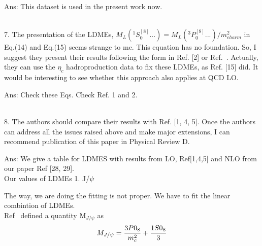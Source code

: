 \documentclass[aps,prc,preprint]{revtex4}
\begin{document}
Ans: This dataset is used in the present work now.

\ \\


7. The presentation of the LDMEs, $M_L(^1S^{[8]}_0 ...) = M_L(^3P^{[8]}_0 ...)/m^2_{charm}$
in Eq.(14) and Eq.(15) seems strange to me. This equation has no foundation. 
So, I suggest they present their results following the form in Ref. [2] or Ref.~\cite{Cho:1995vh}. 
Actually, they can use the $\eta_c$ hadroproduction data to fix these LDMEs, as 
Ref. [15] did. It would be interesting to see whether this approach also applies 
at QCD LO.

Ans: Check these Eqs.  Check Ref. 1 and 2.

\ \\

8. The authors should compare their results with Ref. [1, 4, 5]. Once the authors 
can address all the issues raised above and make major extensions, I can recommend 
publication of this paper in Physical Review D.

Ans: We give a table for LDMES with results from LO, Ref[1,4,5] and 
NLO from our paper Ref [28, 29].\\
Our values of LDMEs
1. J/$\psi$ 





The way, we are doing the fitting is not proper. We have to fit the linear combintion of LDMEs.\\







Ref~\cite{Cho:1995vh} defined a quantity M$_{J/\psi}$ as 
\begin{equation}
M_{J/\psi} = \frac{3P0_8}{m_{c}^2} + \frac{1S0_8}{3} \\ \nonumber
\end{equation}









\ \\
\end{document}
